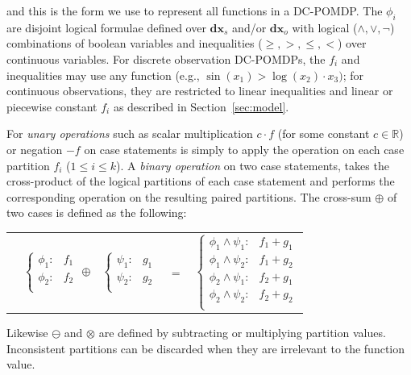 \documentclass{article} %
\newcommand{\xds}{\mathbf{dx}_s}
\newcommand{\xdo}{\mathbf{dx}_o}
\begin{document}
and this is the form we use to represent all functions in a DC-POMDP.
The $\phi_i$ are disjoint logical formulae defined over $\xds$ and/or $\xdo$ with logical ($\land,\lor,\neg$) combinations of boolean variables and inequalities ($\geq,>,\leq,<$) over continuous variables.  
For discrete observation DC-POMDPs, the $f_i$ and inequalities may use any function (e.g., $\sin(x_1) > \log(x_2)\cdot x_3)$; for continuous observations, they are restricted to linear inequalities and linear or piecewise constant $f_i$ as described in Section~\ref{sec:model}.

For \emph{unary operations} such as scalar multiplication $c\cdot f$ (for some constant $c \in \mathbb{R}$) or negation $-f$ on case statements is simply to apply the operation on each case partition $f_i$ ($1 \leq i \leq k$). 
A \emph{binary operation} on two case statements, takes the cross-product of the logical partitions of each case statement and performs the corresponding operation on the resulting paired partitions.  The cross-sum $\oplus$ of two cases is defined as the following:
{\footnotesize 
\vspace{-4mm}
\begin{center}
\begin{tabular}{r c c c l}
&
\hspace{-6mm} 
  $\begin{cases}
    \phi_1: & f_1 \\ 
    \phi_2: & f_2 \\ 
  \end{cases}$
$\oplus$
&
\hspace{-4mm}
  $\begin{cases}
    \psi_1: & g_1 \\ 
    \psi_2: & g_2 \\ 
  \end{cases}$
&
\hspace{-2mm} 
$ = $
&
\hspace{-2mm}
  $\begin{cases}
  \phi_1 \wedge \psi_1: & f_1 + g_1 \\ 
  \phi_1 \wedge \psi_2: & f_1 + g_2 \\ 
  \phi_2 \wedge \psi_1: & f_2 + g_1 \\ 
  \phi_2 \wedge \psi_2: & f_2 + g_2 \\ 
  \end{cases}$
\end{tabular}
\end{center}
\vspace{-2mm}
}
Likewise $\ominus$ and $\otimes$ are defined by subtracting or multiplying partition values.  Inconsistent partitions can be discarded when they are irrelevant to the function value.
\end{document}
